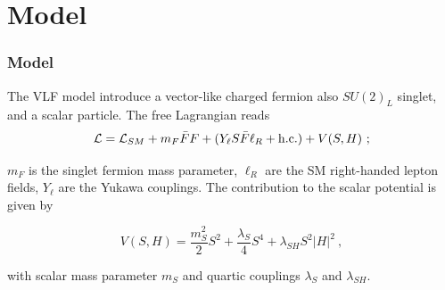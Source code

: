 \documentclass{beamer}
\begin{document}
\begin{frame}
\begin{figure}[!h]
\end{figure}



\end{frame}


\section{Model}
\begin{frame}
\frametitle{Model}
\begin{justify}

 The VLF model introduce a vector-like charged fermion also $SU(2)_L$ singlet, and a scalar particle. The free Lagrangian reads
 \begin{equation}\nonumber
 \mathcal{L} = \mathcal{L}_{SM} +  m_F \bar{F}F + ( Y_\ell S \bar{F}\ell_R + {\rm h.c.} ) + V(S,H)~;
 \end{equation}\label{EQ}
 
 $m_F$ is the singlet fermion mass parameter, $\ell_R$ are the SM right-handed lepton fields, $Y_\ell$ 
 are the Yukawa couplings. The contribution to the scalar potential is given by
 
 \begin{equation}\nonumber
 V(S,H) = \frac{m_S^2}{2} S^2 + \frac{\lambda_S}{4} S^4 + \lambda_{SH} S^2|H|^2 ~,
 \end{equation}
 
 with scalar mass parameter $m_S$ and quartic couplings $\lambda_{S}$ and $\lambda_{SH}$.
 

\end{justify}

\end{frame}
\end{document}

